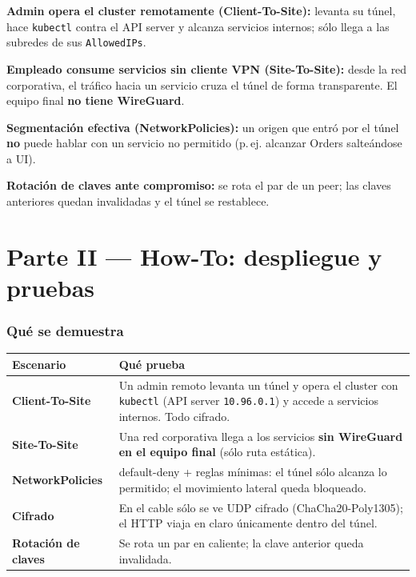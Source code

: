 \documentclass[11pt,a4paper]{article}
\newcommand{\cmd}[1]{\texttt{#1}}
\begin{document}
\begin{description}[leftmargin=1.4cm,style=nextline]
  \item[CU-1] \textbf{Admin opera el cluster remotamente (Client-To-Site):}
        levanta su túnel, hace \cmd{kubectl} contra el API server y alcanza
        servicios internos; sólo llega a las subredes de sus \cmd{AllowedIPs}.
  \item[CU-2] \textbf{Empleado consume servicios sin cliente VPN (Site-To-Site):}
        desde la red corporativa, el tráfico hacia un servicio cruza el túnel de
        forma transparente. El equipo final \textbf{no tiene WireGuard}.
  \item[CU-3] \textbf{Segmentación efectiva (NetworkPolicies):} un origen que
        entró por el túnel \textbf{no} puede hablar con un servicio no permitido
        (p.\,ej. alcanzar Orders salteándose a UI).
  \item[CU-4] \textbf{Rotación de claves ante compromiso:} se rota el par de un
        peer; las claves anteriores quedan invalidadas y el túnel se restablece.
\end{description}

\newpage
{}
\part*{Parte II — How-To: despliegue y pruebas}

\section{Qué se demuestra}
\renewcommand{\arraystretch}{1.3}
\begin{tabularx}{\linewidth}{@{}>{\bfseries}p{3.2cm} X@{}}
\toprule
Escenario & Qué prueba \\
\midrule
Client-To-Site & Un admin remoto levanta un túnel y opera el cluster con
\cmd{kubectl} (API server \cmd{10.96.0.1}) y accede a servicios internos. Todo
cifrado. \\
Site-To-Site & Una red corporativa llega a los servicios \textbf{sin WireGuard en
el equipo final} (sólo ruta estática). \\
NetworkPolicies & default-deny + reglas mínimas: el túnel sólo alcanza lo
permitido; el movimiento lateral queda bloqueado. \\
Cifrado & En el cable sólo se ve UDP cifrado (ChaCha20-Poly1305); el HTTP viaja
en claro únicamente dentro del túnel. \\
Rotación de claves & Se rota un par en caliente; la clave anterior queda
invalidada. \\
\bottomrule
\end{tabularx}
\end{document}
